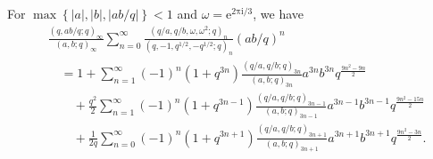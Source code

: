 \documentclass[10pt,a4paper]{amsart}
\begin{document}
\begin{theorem}\label{thm4}
For $\max\left\{|a|, |b|, |ab/q|\right\}<1$ and  $\omega=\mathrm{e^{2\pi\mathrm{i}/3}}$, we have
\begin{align*}
&\frac{\left(q,ab/q;q\right)_{\infty}}{\left(a,b;q\right)_{\infty}}
\sum_{n=0}^{\infty}
\frac{\left(q/a,q/b,\omega,\omega^2;q\right)_n}
{\left(q,-1,q^{1/2},-q^{1/2};q\right)_n}\left(ab/q\right)^n\\
&\quad=1+\sum_{n=1}^{\infty}\left(-1\right)^n\left(1+q^{3n}\right)
\frac{\left(q/a,q/b;q\right)_{3n}}
{\left(a,b;q\right)_{3n}}
a^{3n}b^{3n}q^{\frac{9n^2-9n}{2}}\\
&\qquad+\frac{q^2}{2}\sum_{n=1}^{\infty}\left(-1\right)^n\left(1+q^{3n-1}\right)
\frac{\left(q/a,q/b;q\right)_{3n-1}}
{\left(a,b;q\right)_{3n-1}}
a^{3n-1}b^{3n-1}q^{\frac{9n^2-15n}{2}}\\
&\qquad+\frac{1}{2q}\sum_{n=0}^{\infty}\left(-1\right)^n\left(1+q^{3n+1}\right)
\frac{\left(q/a,q/b;q\right)_{3n+1}}
{\left(a,b;q\right)_{3n+1}}
a^{3n+1}b^{3n+1}q^{\frac{9n^2-3n}{2}}
.
\end{align*}
\end{theorem}
\end{document}
